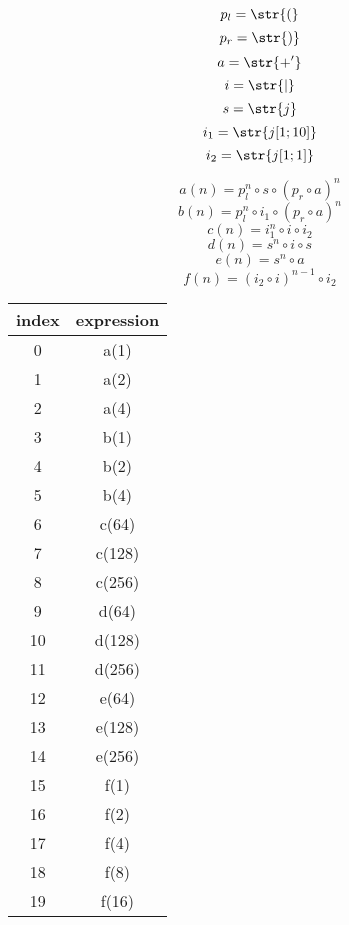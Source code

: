 \label{app:RegularExpressionTable}
$$p_l=\str{(}$$
$$p_r=\str{)}$$
$$a=\str{+'}$$
$$i=\str{|}$$
$$s=\str{j}$$
$$i_1=\str{j[1;10]}$$
$$i_2=\str{j[1;1]}$$

$$a(n)=p_l^n \circ s \circ (p_r \circ a)^n$$
$$b(n)=p_l^n \circ i_1 \circ (p_r \circ a)^n$$
$$c(n)=i_1^n \circ i \circ i_2$$
$$d(n)=s^n \circ i \circ s$$
$$e(n)=s^n \circ a$$
$$f(n)=(i_2 \circ i)^{n-1} \circ i_2$$

\begin{tabular}{|c|c|}
    \hline
    index & expression \\
    \hline
    0  & a(1) \\
    1  & a(2) \\
    2  & a(4) \\
    \hline
    3  & b(1) \\
    4  & b(2) \\
    5  & b(4) \\
    \hline
    6  & c(64) \\
    7  & c(128) \\
    8  & c(256) \\
    \hline
    9  & d(64) \\
    10 & d(128) \\
    11 & d(256) \\
    \hline
    12 & e(64) \\
    13 & e(128) \\
    14 & e(256) \\
    \hline
    15 & f(1) \\
    16 & f(2) \\
    17 & f(4) \\
    18 & f(8) \\
    19 & f(16) \\
    \hline
\end{tabular}